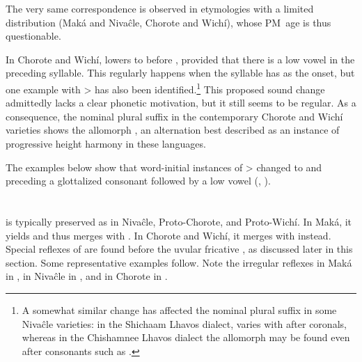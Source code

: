 The very same correspondence is observed in etymologies with a limited distribution (Maká and Nivaĉle, Chorote and Wichí), whose PM~age is thus questionable.

\begin{exe}
    \ex \spin
    \ex \spillmn
    \ex \ameiva
    \ex \pocote
    \ex \dreamv
    \ex \dreamn
    \ex \tobacco
    \ex \foot
    \ex \coati
    \ex \hunger
    \ex \ocelot
    \ex \tortoise
    \ex \spitmn
    \ex \willow
    \ex \heartmn
    \ex \majan
    \ex \frog
    \ex \standv
    \ex \limpkin
    \ex \siyaj
    \ex \durmili
    \ex \weave
    \ex \metal
    \ex \whiteegret
    \ex \diecw
    \ex \mancw
    \ex \eel
\end{exe}

In Chorote and Wichí,  lowers to  before , provided that there is a low vowel in the preceding syllable. This regularly happens when the syllable has  as the onset, but one example with  >  has also been identified.\footnote{A somewhat similar change has affected the nominal plural suffix  in some Nivaĉle varieties: in the Shichaam Lhavos dialect,  varies with  after coronals, whereas in the Chishamnee Lhavos dialect the allomorph  may be found even after consonants such as  \citep[276–277]{AnG15}.} This proposed sound change admittedly lacks a clear phonetic motivation, but it still seems to be regular. As a consequence, the nominal plural suffix  in the contemporary Chorote and Wichí varieties shows the allomorph , an alternation best described as an instance of progressive height harmony in these languages.

\begin{exe}
    \ex \drinknpl
    \ex \waterpl
    \ex \starn
    \ex \earthpl
    \ex \skinpl
\end{exe}

The examples below show that word-initial instances of  >  changed to  and  preceding a glottalized consonant followed by a low vowel (, ).

\begin{exe}
    \ex \jaguar
    \ex \treen
    \ex \vulture
\end{exe}

\section{}\label{pm-e}
 is typically preserved as  in Nivaĉle, Proto-Chorote, and Proto-Wichí. In Maká, it yields  and thus merges with . In Chorote and Wichí, it merges with  instead. Special reflexes of  are found before the uvular fricative , as discussed later in this section. Some representative examples follow. Note the irregular reflexes in Maká in , in Nivaĉle in , and in Chorote in .

